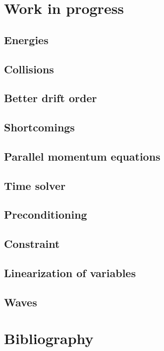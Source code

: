 \documentclass[12pt,a4paper,oneside,openright]{report} %
\begin{document}
\part{Work in progress}

\chapter{Energies}
\label{app:energies}


\chapter{Collisions}
\label{app:collisions}


\chapter{Better drift order}
\label{app:betterDO}


\chapter{Shortcomings}
\label{app:shortcomings}


\chapter{Parallel momentum equations}
\label{app:parMom}


\chapter{Time solver}
\label{app:timeSolver}


\chapter{Preconditioning}
\label{app:precon}


\chapter{Constraint}


\chapter{Linearization of variables}
\label{app:linearized}


\chapter{Waves}
\label{app:waves}


\part{Bibliography}


\end{document}
